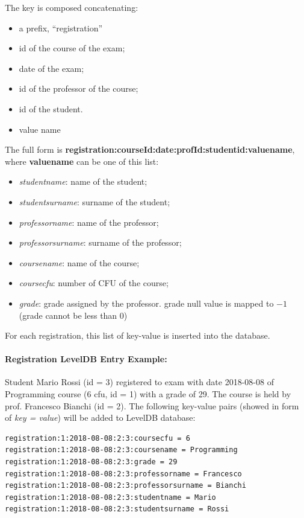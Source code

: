 \documentclass{report}
\begin{document}
The key is composed concatenating:
\begin{itemize}
	\item a prefix, ``registration''
	\item id of the course of the exam;
	\item date of the exam;
	\item id of the professor of the course;
	\item id of the student.
	\item value name
\end{itemize}
The full form is \textbf{registration:courseId:date:profId:studentid:valuename}, where \textbf{valuename} can be one of this list:
\begin{itemize}
	\item \textit{studentname}: name of the student;
	\item \textit{studentsurname}: surname of the student;
	\item \textit{professorname}: name of the professor;
	\item \textit{professorsurname}: surname of the professor;
	\item \textit{coursename}: name of the course;
	\item \textit{coursecfu}: number of CFU of the course;
	\item \textit{grade}: grade assigned by the professor. grade null value is mapped to \(-1\) (grade cannot be less than 0)
\end{itemize}
For each registration, this list of key-value is inserted into the database.

\paragraph{Registration LevelDB Entry Example:}
Student Mario Rossi (id = 3) registered to exam with date 2018-08-08 of Programming course (6 cfu, id = 1) with a grade of 29. The course is held by prof. Francesco Bianchi (id = 2). The following key-value pairs (showed in form of \textit{key = value}) will be added to LevelDB database:
\begin{lstlisting}
registration:1:2018-08-08:2:3:coursecfu = 6
registration:1:2018-08-08:2:3:coursename = Programming
registration:1:2018-08-08:2:3:grade = 29
registration:1:2018-08-08:2:3:professorname = Francesco
registration:1:2018-08-08:2:3:professorsurname = Bianchi
registration:1:2018-08-08:2:3:studentname = Mario
registration:1:2018-08-08:2:3:studentsurname = Rossi
\end{lstlisting}
\end{document}
